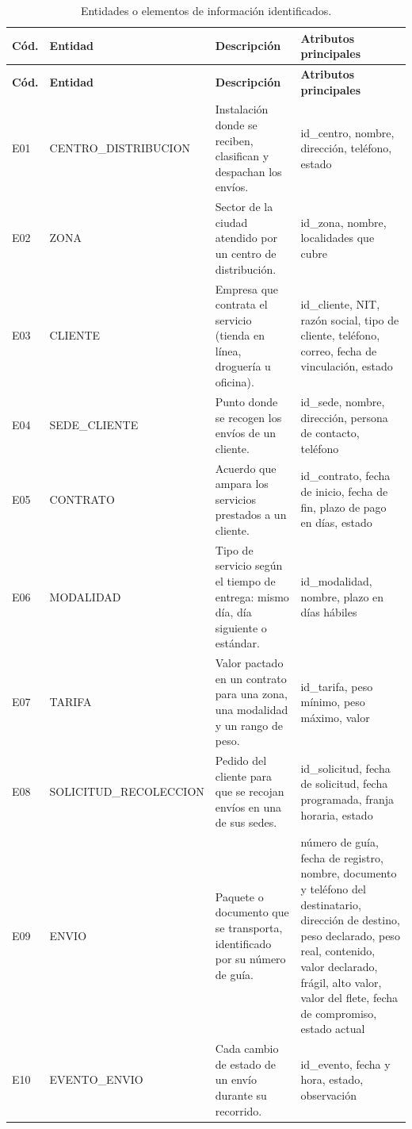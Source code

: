 {\singlespacing\small
\begin{longtable}{L{0.9cm} L{3.4cm} L{4.2cm} L{5.6cm}}
\caption{Entidades o elementos de información identificados.}
\label{tab:entidades}\\
\toprule
\textbf{Cód.} & \textbf{Entidad} & \textbf{Descripción} & \textbf{Atributos principales} \\
\midrule
\endfirsthead
\toprule
\textbf{Cód.} & \textbf{Entidad} & \textbf{Descripción} & \textbf{Atributos principales} \\
\midrule
\endhead
\bottomrule
\endfoot
E01 & CENTRO\_\allowbreak DISTRIBUCION & Instalación donde se reciben, clasifican y despachan los envíos. & id\_centro, nombre, dirección, teléfono, estado \\
E02 & ZONA & Sector de la ciudad atendido por un centro de distribución. & id\_zona, nombre, localidades que cubre \\
E03 & CLIENTE & Empresa que contrata el servicio (tienda en línea, droguería u oficina). & id\_cliente, NIT, razón social, tipo de cliente, teléfono, correo, fecha de vinculación, estado \\
E04 & SEDE\_\allowbreak CLIENTE & Punto donde se recogen los envíos de un cliente. & id\_sede, nombre, dirección, persona de contacto, teléfono \\
E05 & CONTRATO & Acuerdo que ampara los servicios prestados a un cliente. & id\_contrato, fecha de inicio, fecha de fin, plazo de pago en días, estado \\
E06 & MODALIDAD & Tipo de servicio según el tiempo de entrega: mismo día, día siguiente o estándar. & id\_modalidad, nombre, plazo en días hábiles \\
E07 & TARIFA & Valor pactado en un contrato para una zona, una modalidad y un rango de peso. & id\_tarifa, peso mínimo, peso máximo, valor \\
E08 & SOLICITUD\_\allowbreak RECOLECCION & Pedido del cliente para que se recojan envíos en una de sus sedes. & id\_solicitud, fecha de solicitud, fecha programada, franja horaria, estado \\
E09 & ENVIO & Paquete o documento que se transporta, identificado por su número de guía. & número de guía, fecha de registro, nombre, documento y teléfono del destinatario, dirección de destino, peso declarado, peso real, contenido, valor declarado, frágil, alto valor, valor del flete, fecha de compromiso, estado actual \\
E10 & EVENTO\_\allowbreak ENVIO & Cada cambio de estado de un envío durante su recorrido. & id\_evento, fecha y hora, estado, observación \\

\end{longtable}}
